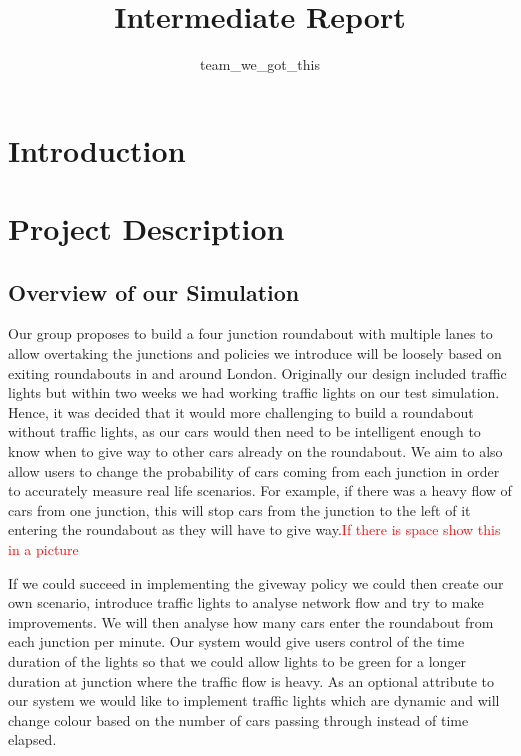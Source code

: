 \documentclass[11pt]{article}
\title{{Intermediate Report}}
\date{}
\author{team\_we\_got\_this}
\begin{document}
\maketitle

\section{Introduction}

\section{Project Description}

\subsection{Overview of our Simulation}

	Our group proposes to build a four junction roundabout with multiple lanes to allow overtaking the junctions and policies we introduce will be loosely based on exiting roundabouts in and around London. Originally our design included traffic lights but within two weeks we had working traffic lights on our test simulation. Hence, it was decided that it would more challenging to build a roundabout without traffic lights, as our cars would then need to be intelligent enough to know when to give way to other cars already on the roundabout. We aim to also allow users to change the probability of cars coming from each junction in order to accurately measure real life scenarios. For example, if there was a heavy flow of cars from one junction, this will stop cars from the junction to the left of it entering the roundabout as they will have to give way.\textcolor{red}{If there is space show this in a picture}
	
	If we could succeed in implementing the giveway policy we could then create our own scenario, introduce
    traffic lights to analyse network flow and try to make improvements. We will then analyse how many cars enter the roundabout from each junction per minute. Our system would give users control of the time duration of the lights so that we could allow lights to be green for a longer duration at junction where the traffic flow is heavy. As an optional attribute to our system we would like to implement traffic lights which are dynamic and will change colour based on the number of cars passing through instead of time elapsed. \\
\end{document}
